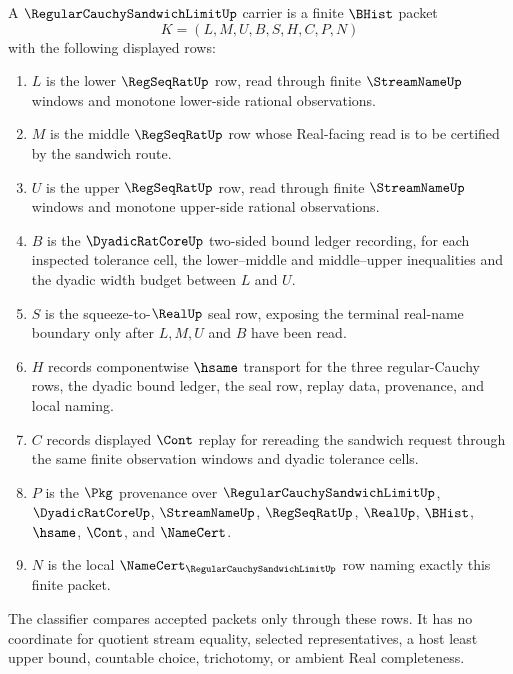 \begin{definition}
\label{def:regular-cauchy-sandwich-limit-carrier}
A $\RegularCauchySandwichLimitUp$ carrier is a finite $\BHist$ packet
$$
K=(L,M,U,B,S,H,C,P,N)
$$
with the following displayed rows:
\begin{enumerate}
\item $L$ is the lower $\RegSeqRatUp$ row, read through finite $\StreamNameUp$ windows and monotone lower-side rational observations.
\item $M$ is the middle $\RegSeqRatUp$ row whose Real-facing read is to be certified by the sandwich route.
\item $U$ is the upper $\RegSeqRatUp$ row, read through finite $\StreamNameUp$ windows and monotone upper-side rational observations.
\item $B$ is the $\DyadicRatCoreUp$ two-sided bound ledger recording, for each inspected tolerance cell, the lower--middle and middle--upper inequalities and the dyadic width budget between $L$ and $U$.
\item $S$ is the squeeze-to-$\RealUp$ seal row, exposing the terminal real-name boundary only after $L,M,U$ and $B$ have been read.
\item $H$ records componentwise $\hsame$ transport for the three regular-Cauchy rows, the dyadic bound ledger, the seal row, replay data, provenance, and local naming.
\item $C$ records displayed $\Cont$ replay for rereading the sandwich request through the same finite observation windows and dyadic tolerance cells.
\item $P$ is the $\Pkg$ provenance over $\RegularCauchySandwichLimitUp$, $\DyadicRatCoreUp$, $\StreamNameUp$, $\RegSeqRatUp$, $\RealUp$, $\BHist$, $\hsame$, $\Cont$, and $\NameCert$.
\item $N$ is the local $\NameCert_{\RegularCauchySandwichLimitUp}$ row naming exactly this finite packet.
\end{enumerate}
The classifier compares accepted packets only through these rows. It has no coordinate for quotient stream equality, selected representatives, a host least upper bound, countable choice, trichotomy, or ambient Real completeness.
\end{definition}

